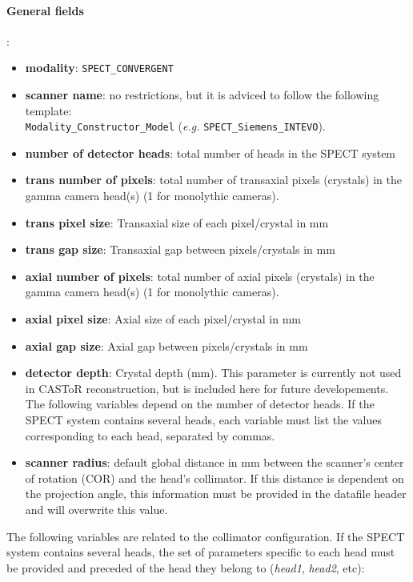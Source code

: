 \documentclass[a4paper, 11pt]{article}
\begin{document}
\paragraph{General fields}:
\begin{itemize}
  \item \textbf{modality}: \texttt{SPECT\_CONVERGENT}
  \item \textbf{scanner name}: no restrictions, but it is adviced to follow the following template:\\
        \texttt{Modality\_Constructor\_Model} (\textit{e.g.} \texttt{SPECT\_Siemens\_INTEVO}).
  \item \textbf{number of detector heads}: total number of heads in the SPECT system
  \item \textbf{trans number of pixels}: total number of transaxial pixels (crystals) in the gamma camera head(s) (1 for monolythic cameras).
  \item \textbf{trans pixel size}: Transaxial size of each pixel/crystal in mm
  \item \textbf{trans gap size}: Transaxial gap between pixels/crystals in mm
  \item \textbf{axial number of pixels}: total number of axial pixels (crystals) in the gamma camera head(s) (1 for monolythic cameras).
  \item \textbf{axial pixel size}: Axial size of each pixel/crystal in mm
  \item \textbf{axial gap size}: Axial gap between pixels/crystals in mm
  \item \textbf{detector depth}: Crystal depth (mm). This parameter is currently not used in CASToR reconstruction, but is included here for future
        developements. The following variables depend on the number of detector heads. If the SPECT system contains several heads, each variable
        must list the values corresponding to each head, separated by commas.
  \item \textbf{scanner radius}: default global distance in mm between the scanner's center of rotation (COR) and the head's collimator. If this
        distance is dependent on the projection angle, this information must be provided in the datafile header and will overwrite this value.
\end{itemize}

The following variables are related to the collimator configuration. If the SPECT system contains several heads, the set of parameters specific to
each head must be provided and preceded of the head they belong to (\textit{head1}, \textit{head2}, etc):
\end{document}
